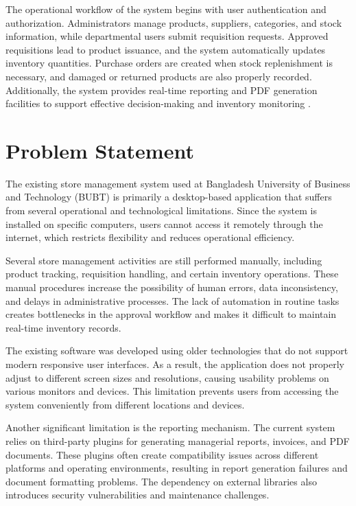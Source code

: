 The operational workflow of the system begins with user authentication and authorization. Administrators manage products, suppliers, categories, and stock information, while departmental users submit requisition requests. Approved requisitions lead to product issuance, and the system automatically updates inventory quantities. Purchase orders are created when stock replenishment is necessary, and damaged or returned products are also properly recorded. Additionally, the system provides real-time reporting and PDF generation facilities to support effective decision-making and inventory monitoring \cite{university_inventory}.

\section{Problem Statement}

The existing store management system used at Bangladesh University of Business and Technology (BUBT) is primarily a desktop-based application that suffers from several operational and technological limitations. Since the system is installed on specific computers, users cannot access it remotely through the internet, which restricts flexibility and reduces operational efficiency.

Several store management activities are still performed manually, including product tracking, requisition handling, and certain inventory operations. These manual procedures increase the possibility of human errors, data inconsistency, and delays in administrative processes. The lack of automation in routine tasks creates bottlenecks in the approval workflow and makes it difficult to maintain real-time inventory records.

The existing software was developed using older technologies that do not support modern responsive user interfaces. As a result, the application does not properly adjust to different screen sizes and resolutions, causing usability problems on various monitors and devices. This limitation prevents users from accessing the system conveniently from different locations and devices.

Another significant limitation is the reporting mechanism. The current system relies on third-party plugins for generating managerial reports, invoices, and PDF documents. These plugins often create compatibility issues across different platforms and operating environments, resulting in report generation failures and document formatting problems. The dependency on external libraries also introduces security vulnerabilities and maintenance challenges.

